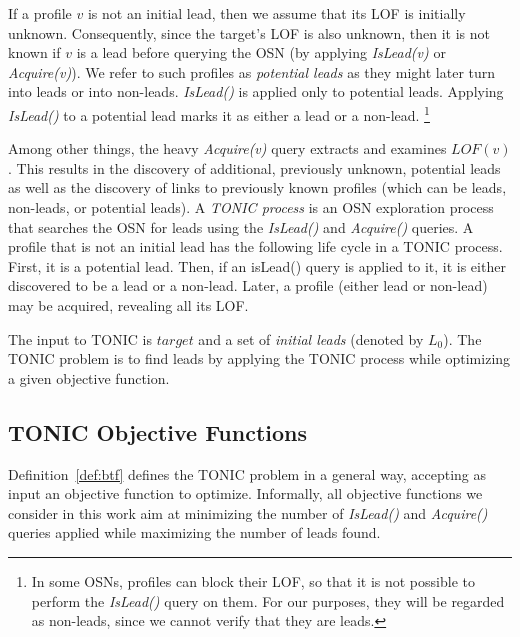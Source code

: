\documentclass[prodmode,acmtecs]{acmsmall} %
\newcommand{\note}[2]{\textbf{\textsc{#1} says: \textit{#2}}}
\newcommand{\islead}[1]{{\em IsLead(#1)}}
\newcommand{\acquire}[1]{{\em Acquire(#1)}}
\begin{document}
If a profile $v$ is not an initial lead, then we assume that its LOF is initially unknown.
Consequently, since the target's LOF is also unknown, then it is not known if $v$ is a lead before querying the OSN  (by applying \islead{v} or \acquire{v}). We refer to such profiles as {\em potential leads} as they might later turn into leads or into non-leads. \islead{} is applied only to potential leads.  Applying \islead{} to a potential lead marks it as either a lead or a non-lead. %
\footnote{In some OSNs, profiles can block their LOF, so that it is not possible to perform the \islead{} query on them. For our purposes, they will be regarded as non-leads, since we cannot verify that they are leads.} 





%

Among other things, the heavy \acquire{v} query extracts and examines $LOF(v)$. This results in the discovery of additional, previously unknown, potential leads as well as the discovery of links to previously known profiles (which can be leads, non-leads, or potential leads). A {\em TONIC process} is an OSN exploration process that searches the OSN for leads using the \islead{} and \acquire{} queries.
A profile that is not an initial lead has the following life cycle in a TONIC process. First, it is a potential lead. Then, if an isLead() query is applied to it, it is either discovered to be a lead or a non-lead. Later, a profile (either lead or non-lead) may be acquired, revealing all its LOF. 



  

\begin{definition}

The input to TONIC is $target$ and a set of {\em initial leads} (denoted by \(L_0\)). The TONIC problem is to find leads by applying the TONIC process while optimizing a given objective function. 
\label{def:btf}
\end{definition}

\subsection{TONIC Objective Functions}
Definition~\ref{def:btf} defines the TONIC problem in a general way, accepting as input an objective function to optimize. Informally, all objective functions we consider in this work aim at minimizing the number of \islead{} and \acquire{} queries applied while maximizing the number of leads found. 
\end{document}
